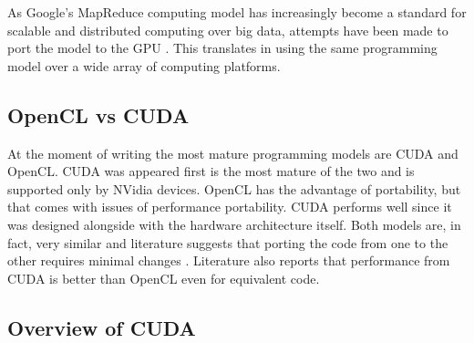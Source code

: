 As Google's MapReduce computing model has increasingly become a standard for scalable and distributed computing over big data, attempts have been made to port the model to the GPU \cite{Ji2011,Xin2012,He2008}.
This translates in using the same programming model over a wide array of computing platforms.


\subsection{OpenCL vs CUDA}

At the moment of writing the most mature programming models are CUDA and OpenCL.
CUDA was appeared first is the most mature of the two and is supported only by NVidia devices.
OpenCL has the advantage of portability, but that comes with issues of performance portability.
CUDA performs well since it was designed alongside with the hardware architecture itself.
Both models are, in fact, very similar and literature suggests that porting the code from one to the other requires minimal changes \cite{Karimi2010,Su2012}.
Literature also reports that performance from CUDA is better than OpenCL even for equivalent code.








\subsection{Overview of CUDA}


